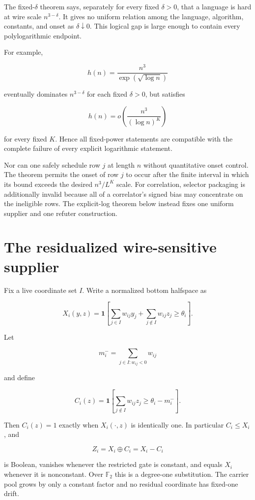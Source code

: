 \documentclass[11pt,letterpaper]{article}
\theoremstyle{definition}
\theoremstyle{remark}
\begin{document}
The fixed-\(\delta\) theorem says, separately for every fixed
\(\delta>0\), that a language is hard at wire scale \(n^{3-\delta}\). It
gives no uniform relation among the language, algorithm, constants, and
onset as \(\delta\downarrow0\). This logical gap is large enough to
contain every polylogarithmic endpoint.

For example,

\[
h(n)=\frac{n^3}{\exp(\sqrt{\log n})}
\]

eventually dominates \(n^{3-\delta}\) for each fixed \(\delta>0\), but
satisfies

\[
h(n)=o\left(\frac{n^3}{(\log n)^K}\right)
\]

for every fixed \(K\). Hence all fixed-power statements are compatible
with the complete failure of every explicit logarithmic statement.

Nor can one safely schedule row \(j\) at length \(n\) without
quantitative onset control. The theorem permits the onset of row \(j\)
to occur after the finite interval in which its bound exceeds the
desired \(n^3/L^K\) scale. For correlation, selector packaging is
additionally invalid because all of a correlator's
signed bias may concentrate on the ineligible rows. The explicit-log
theorem below instead fixes one uniform supplier and one refuter
construction.

\section{The residualized wire-sensitive
supplier}\label{4-the-residualized-wire-sensitive-supplier}

Fix a live coordinate set \(I\). Write a normalized bottom halfspace as

\[
X_i(y,z)
{}={}
\mathbf1\left[
\sum_{j\in I}w_{ij}y_j+
\sum_{j\notin I}w_{ij}z_j
\ge\theta_i
\right].
\]

Let

\[
m_i^-=\sum_{j\in I:w_{ij}<0}w_{ij}
\]

and define

\[
C_i(z)
{}={}
\mathbf1\left[
\sum_{j\notin I}w_{ij}z_j
\ge\theta_i-m_i^-
\right].
\]

Then \(C_i(z)=1\) exactly when \(X_i(\cdot,z)\) is identically one. In
particular \(C_i\le X_i\), and

\[
Z_i=X_i\oplus C_i=X_i-C_i
\]

is Boolean, vanishes whenever the restricted gate is constant, and
equals \(X_i\) whenever it is nonconstant. Over \(\mathbb F_2\) this is
a degree-one substitution. The carrier pool grows by only a constant
factor and no residual coordinate has fixed-one drift.
\end{document}
